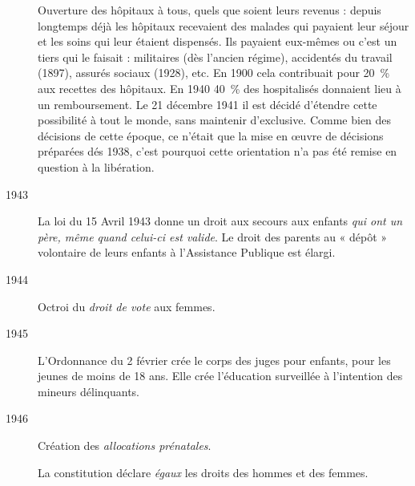 \begin{description}
Ouverture des hôpitaux à tous, quels que soient leurs revenus : depuis longtemps déjà les hôpitaux recevaient des malades qui payaient leur séjour et les soins qui leur étaient dispensés. Ils payaient eux-mêmes ou c'est un tiers qui le faisait : militaires (dès l'ancien régime), accidentés du travail (1897), assurés sociaux (1928), etc. En 1900 cela contribuait pour 20~\% aux recettes des hôpitaux. En 1940 40~\% des hospitalisés donnaient lieu à un remboursement. Le 21 décembre 1941 il est décidé d'étendre cette possibilité à tout le monde, sans maintenir d'exclusive. Comme bien des décisions de cette époque, ce n'était que la mise en œuvre de décisions préparées dés 1938, c'est pourquoi cette orientation n'a pas été remise en question à la libération.

\item[1943] La loi du 15 Avril 1943 donne un droit aux secours aux enfants \emph{qui ont un père, même quand celui-ci est valide}. Le droit des parents au « dépôt » volontaire de leurs enfants à l'Assistance Publique est élargi.

\item[1944] Octroi du \emph{droit de vote} aux femmes. 

\item[1945] L'Ordonnance du 2 février crée le corps des juges pour enfants, pour les jeunes de moins de 18 ans. Elle crée l'éducation surveillée à l'intention des mineurs délinquants.

\item[1946] Création des \emph{allocations prénatales}.

La constitution déclare \emph{égaux} les droits des hommes et des femmes.
\end{description}


